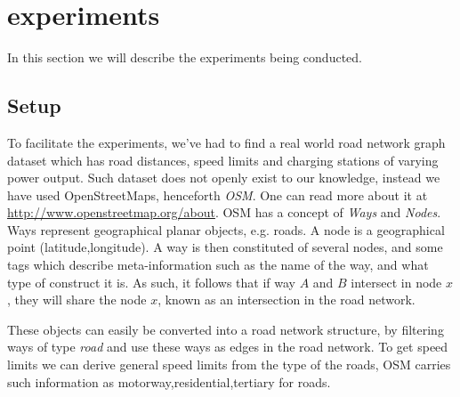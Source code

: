 \section{experiments} %
\label{sec:experiments}
In this section we will describe the experiments being conducted.
\subsection{Setup} %
\label{sub:setup}
To facilitate the experiments, we've had to find a real world road network graph dataset which has road distances, speed limits and charging stations of varying power output. Such dataset does not openly exist to our knowledge, instead we have used OpenStreetMaps, henceforth \textit{OSM}. One can read more about it at \url{http://www.openstreetmap.org/about}. OSM has a concept of \textit{Ways} and \textit{Nodes}. Ways represent geographical planar objects, e.g. roads. A node is a geographical point (latitude,longitude). A way is then constituted of several nodes, and some tags which describe meta-information such as the name of the way, and what type of construct it is. As such, it follows that if way $A$ and $B$ intersect in node $x$, they will share the node $x$, known as an intersection in the road network. 


These objects can easily be converted into a road network structure, by filtering ways of type \textit{road} and use these ways as edges in the road network. To get speed limits we can derive general speed limits from the type of the roads, OSM carries such information as motorway,residential,tertiary for roads. 

